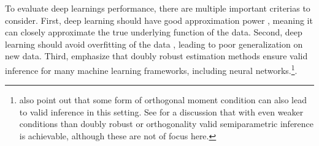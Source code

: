 To evaluate deep learnings performance, there are multiple important criterias to consider.
First, deep learning should have good approximation power \citep{belloni2017program}, meaning it can closely approximate the true underlying function of the data.
Second, deep learning should avoid overfitting of the data \citep{belloni2017program}, leading to poor generalization on new data.
Third, \citet{belloni2017program} emphasize that doubly robust estimation methods ensure valid inference for many machine learning frameworks, including neural networks.\footnote[4]{\citet{belloni2017program} also point out that some form of orthogonal moment condition can also lead to valid inference in this setting. See \citet{DeepLearningIndividual2021} for a discussion that with even weaker conditions than doubly robust or orthogonality valid semiparametric inference is achievable, although these are not of focus here.}.




